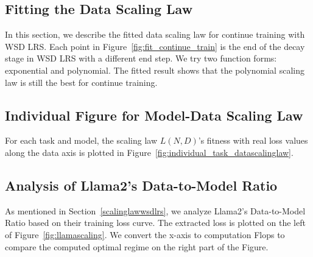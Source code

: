\subsection{Fitting the Data Scaling Law}
\label{app:fittingdatascaling}
In this section, we describe the fitted data scaling law for continue training with WSD LRS. 
Each point in Figure~\ref{fig:fit_continue_train} is the end of the decay stage in WSD LRS with a different end step. We try two function forms: exponential and polynomial. The fitted result shows that the polynomial scaling law is still the best for continue training.

\subsection{Individual Figure for Model-Data Scaling Law}
For each task and model, the scaling law $L(N, D)$'s fitness with real loss values along the data axis is plotted in Figure~\ref{fig:individual_task_datascalinglaw}.

\subsection{Analysis of Llama2's Data-to-Model Ratio}
As mentioned in Section~\ref{scalinglawwsdlrs}, we analyze Llama2's Data-to-Model Ratio based on their training loss curve. The extracted loss is plotted on the left of Figure~\ref{fig:llamascaling}. We convert the x-axis to computation Flops to compare the computed optimal regime on the right part of the Figure. 

